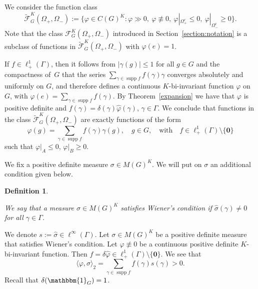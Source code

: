 \documentclass[[a4paper,english,12pt]{amsart}
\theoremstyle{plain}
\newtheorem{definition}[theorem]{Definition}
\theoremstyle{remark}
\newcommand\supp{\operatorname{supp}}
\newcommand{\ff}{\varphi}
\begin{document}
We consider the function class 
$$
\widetilde{\mathcal{F}}^K_G(\Omega_+, \Omega_-) := \{ \varphi \in C(G)^K : \varphi  \gg 0, \ \varphi \not\equiv 0, \ \varphi|_{\Omega_+^c} \le 0, \  \varphi|_{\Omega_-^c} \ge 0 \}.
$$
Note that the class $\mathcal{F}^K_G(\Omega_+, \Omega_-)$ introduced in Section~\ref{section:notation} is a subclass of functions in $\widetilde{\mathcal{F}}^K_G(\Omega_+, \Omega_-)$ with $\ff(e) = 1$.

If $f \in \ell^1_+(\Gamma)$, then it follows from $|\gamma(g)| \le 1$ for all \(g \in G\) and the compactness of~$G$ that the series $\sum_{\gamma \in \supp{f}} f(\gamma)  \gamma$ converges absolutely and uniformly on $G$, and therefore defines a continuous $K$-bi-invariant function $\ff$ on $G$, with $\varphi(e) = \sum_{\gamma \in \supp{f}} f(\gamma)$. By Theorem~\ref{expansion} we have that $\ff$ is positive definite and $f(\gamma) = \delta(\gamma) \widehat{\ff}(\gamma)$, $\gamma \in \Gamma$. We conclude that functions in the class $\widetilde{\mathcal{F}}^K_G(\Omega_+, \Omega_-)$ are exactly functions of the form
$$
\varphi(g) = \sum_{\gamma \in \supp{f}} f(\gamma) \gamma(g), \quad g \in G, \quad \text{with} \quad f \in \ell^1_+(\Gamma) \setminus \{\mathbf{0}\}
$$
such that $\varphi|_A \le 0$, $\varphi|_B \ge 0$.

 We fix a positive definite measure $\sigma \in M(G)^K$. We will put on $\sigma$ an additional condition given below.

\begin{definition} \label{def:wiener}

We say that a measure $\sigma \in M(G)^K$ satisfies \emph{Wiener's condition} if $\widehat{\sigma}(\gamma) \ne 0$ for all $\gamma \in \Gamma$.

\end{definition}

We denote $s := \widehat{\sigma} \in \ell^\infty(\Gamma)$. Let $\sigma \in M(G)^K$ be a positive definite measure that satisfies Wiener's condition. Let $\ff \not\equiv 0$ be a continuous positive definite $K$-bi-invariant function. Then $f = \delta \widehat{\ff} \in \ell^1_+(\Gamma) \setminus \{ \mathbf{0} \}$. We see that
\begin{equation} \label{eq:sigma-form-positive}
\langle \varphi, \sigma \rangle_2 = \sum_{\gamma \in \supp{f}} f(\gamma) s(\gamma) > 0.
\end{equation}
Recall that $\delta(\mathbbm{1}_G) = 1$.
\end{document}
